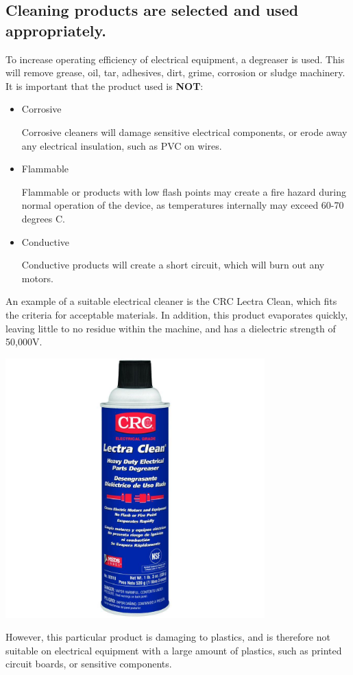 \documentclass[11pt,a4paper]{article}
\begin{document}
\subsection{Cleaning products are selected and used appropriately.}
To increase operating efficiency of electrical equipment, a degreaser is used. This will remove grease, oil, tar, adhesives, dirt, grime, corrosion or sludge machinery. It is important that the product used is \textbf{NOT}:
\begin{itemize}
\item Corrosive

Corrosive cleaners will damage sensitive electrical components, or erode away any electrical insulation, such as PVC on wires.
\item Flammable

Flammable or products with low flash points may create a fire hazard during normal operation of the device, as temperatures internally may exceed 60-70 degrees C.
\item Conductive

Conductive products will create a short circuit, which will burn out any motors.
\end{itemize}
An example of a suitable electrical cleaner is the CRC Lectra Clean, which fits the criteria for acceptable materials. In addition, this product evaporates quickly, leaving little to no residue within the machine, and has a dielectric strength of 50,000V.
\begin{center}
\includegraphics[width=10cm]{electroclean}
\end{center}
However, this particular product is damaging to plastics, and is therefore not suitable on electrical equipment with a large amount of plastics, such as printed circuit boards, or sensitive components.
\newpage
\end{document}
